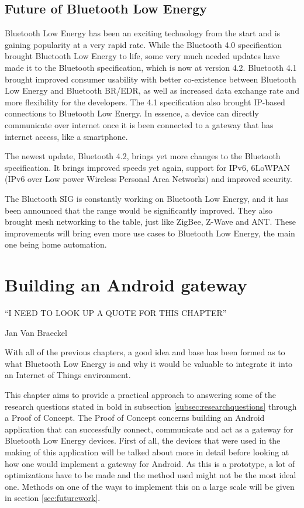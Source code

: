 \documentclass[pdftex,a4paper,12pt,twoside]{report}
\begin{document}
\section{Future of Bluetooth Low Energy}
\label{sec:futureble}
Bluetooth Low Energy has been an exciting technology from the start and is gaining popularity at a very rapid rate. While the Bluetooth 4.0 specification brought Bluetooth Low Energy to life, some very much needed updates have made it to the Bluetooth specification, which is now at version 4.2. Bluetooth 4.1 brought improved consumer usability with better co-existence between Bluetooth Low Energy and Bluetooth BR/EDR, as well as increased data exchange rate and more flexibility for the developers. The 4.1 specification also brought IP-based connections to Bluetooth Low Energy. In essence, a device can directly communicate over internet once it is been connected to a gateway that has internet access, like a smartphone.

The newest update, Bluetooth 4.2, brings yet more changes to the Bluetooth specification. It brings improved speeds yet again, support for IPv6, 6LoWPAN (IPv6 over Low power Wireless Personal Area Networks) and improved security.

The Bluetooth SIG is constantly working on Bluetooth Low Energy, and it has been announced that the range would be significantly improved. They also brought mesh networking to the table, just like ZigBee, Z-Wave and ANT. These improvements will bring even more use cases to Bluetooth Low Energy, the main one being home automation.

\chapter{Building an Android gateway}
\label{ch:android}
\epigraph{``I NEED TO LOOK UP A QUOTE FOR THIS CHAPTER''}{Jan Van Braeckel}
With all of the previous chapters, a good idea and base has been formed as to what Bluetooth Low Energy is and why it would be valuable to integrate it into an Internet of Things environment.

This chapter aims to provide a practical approach to answering some of the research questions stated in bold in subsection \ref{subsec:researchquestions} through a Proof of Concept. The Proof of Concept concerns building an Android application that can successfully connect, communicate and act as a gateway for Bluetooth Low Energy devices. First of all, the devices that were used in the making of this application will be talked about more in detail before looking at how one would implement a gateway for Android. As this is a prototype, a lot of optimizations have to be made and the method used might not be the most ideal one. Methods on one of the ways to implement this on a large scale will be given in section \ref{sec:futurework}.
\end{document}
